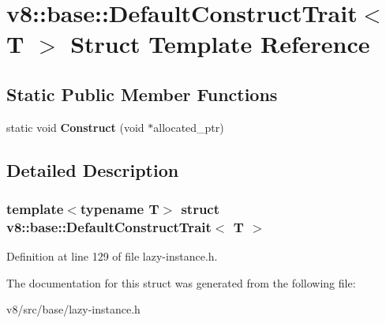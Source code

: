 \hypertarget{structv8_1_1base_1_1DefaultConstructTrait}{}\section{v8\+:\+:base\+:\+:Default\+Construct\+Trait$<$ T $>$ Struct Template Reference}
\label{structv8_1_1base_1_1DefaultConstructTrait}
\subsection*{Static Public Member Functions}
\begin{DoxyCompactItemize}
\item 
\mbox{\label{structv8_1_1base_1_1DefaultConstructTrait_a8f534dd2fa72c76288bb4cd9e9e2a881}} 
static void {\bfseries Construct} (void $\ast$allocated\+\_\+ptr)
\end{DoxyCompactItemize}


\subsection{Detailed Description}
\subsubsection*{template$<$typename T$>$\newline
struct v8\+::base\+::\+Default\+Construct\+Trait$<$ T $>$}



Definition at line 129 of file lazy-\/instance.\+h.



The documentation for this struct was generated from the following file\+:\begin{DoxyCompactItemize}
\item 
v8/src/base/lazy-\/instance.\+h\end{DoxyCompactItemize}
